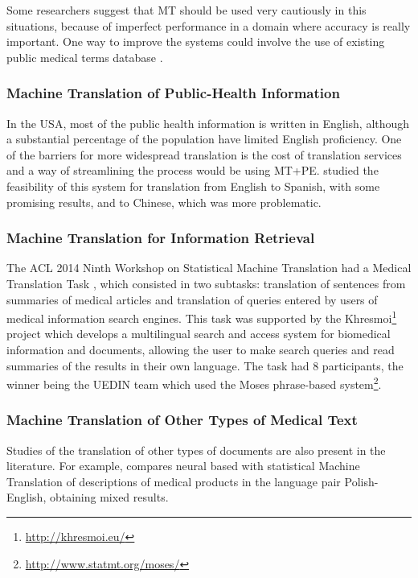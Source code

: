 Some researchers \citep{G2013, Conference2012, Kaliyadan2010} suggest that MT should be used very cautiously in this situations, because of imperfect performance in a domain where accuracy is really important. One way to improve the systems could involve the use of existing public medical terms database \citep{Eck2004}.

\subsubsection{Machine Translation of Public-Health Information}

In the USA, most of the public health information is written in English, although a substantial percentage of the population have limited English proficiency. One of the barriers for more widespread translation is the cost of translation services and a way of streamlining the process would be using MT+PE. \citep{Kirchhoff2011, Turner2015} studied the feasibility of this system for translation from English to Spanish, with some promising results, and to Chinese, which was more problematic.

\subsubsection{Machine Translation for Information Retrieval}

The ACL 2014 Ninth Workshop on Statistical Machine Translation had a Medical Translation Task \citep{Bojar2014}, which consisted in two subtasks: translation of sentences from summaries of medical articles and translation of queries entered by users of medical information search engines. This task was supported by the Khresmoi\footnote{\url{http://khresmoi.eu/}} project which develops a multilingual search and access system for biomedical information and documents, allowing the user to make search queries and read summaries of the results in their own language. The task had 8 participants, the winner being the UEDIN team \citep{Durrani2014} which used the Moses phrase-based system\footnote{\url{http://www.statmt.org/moses/}}.

\subsubsection{Machine Translation of Other Types of Medical Text}

Studies of the translation of other types of documents are also present in the literature. For example, \citep{Wok2015} compares neural based with statistical Machine Translation of descriptions of medical products in the language pair Polish-English, obtaining mixed results.


